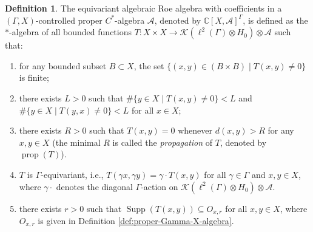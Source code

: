 \documentclass[pdflatex]{sn-jnl}
\theoremstyle{plain}
\theoremstyle{definition}
\newtheorem{definition}[theorem]{Definition}
\begin{document}
\begin{definition}\label{def:equiv-alg-roe-X}
The equivariant algebraic Roe algebra with coefficients in a $(\Gamma,X)$-controlled proper $C^{*}$-algebra $\mathcal{A}$, denoted by $\mathbb{C}[X,\mathcal{A}]^{\Gamma}$, is defined as the $*$-algebra of all bounded functions $T:X\times X\to \mathcal{K}(\ell^2(\Gamma)\otimes H_0)\otimes \mathcal{A}$ such that:
\begin{enumerate}
\item[(1)]for any bounded subset $B\subset X$, the set
$\{(x,y)\in(B\times B)\mid T(x,y)\neq 0 \}$
is finite;
\item[(2)]there exists $L>0$ such that 
$\#\{y\in X\mid T(x,y)\neq 0\}<L$ and
$\#\{y\in X\mid T(y,x)\neq 0\}<L$
for all $x\in X$;
\item[(3)] there exists $R>0$ such that $T(x,y)=0$ whenever $d(x,y)>R$ for any $x,y\in X$ (the minimal $R$ is called the \emph{propagation} of $T$, denoted by $\operatorname{prop}(T)$).
\item[(4)]$T$ is $\Gamma$-equivariant, i.e., $T(\gamma x,\gamma y)=\gamma\cdot T(x, y)$ for all $\gamma\in \Gamma$ and $x, y\in X$, where $\gamma\cdot$ denotes the diagonal $\Gamma$-action on $\mathcal{K}(\ell^2(\Gamma)\otimes H_0) \otimes\mathcal{A}$.
\item[(5)]there exists $r>0$ such that $\operatorname{Supp}(T(x, y))\subseteq O_{x,r}$ for all $x, y\in X$, where $O_{x,r}$ is given in Definition \ref{def:proper-Gamma-X-algebra}.
\end{enumerate}
\end{definition}
\end{document}
